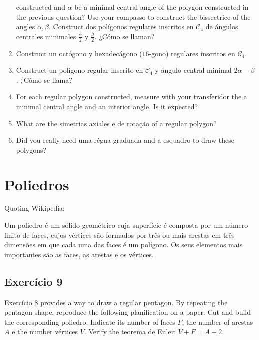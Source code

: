 \begin{enumerate}
  constructed and $\alpha$ be a minimal central angle of the polygon constructed
  in the previous question?
  Use your compasso to construct the bissectrice of the angles
  $\alpha, \beta$. Construct dos polígonos regulares inscritos en
  $\mathcal{C}_4$ de ángulos centrales minimales
  $\frac{\alpha}{2}$ y $\frac{\beta}{2}$. ¿Cómo se llaman?
\item Construct un octógono y hexadecágono ($16$-gono) regulares
  inscritos en $\mathcal{C}_4$.
\item Construct un polígono regular inscrito en $\mathcal{C}_4$ y
  ángulo central minimal $2 \alpha - \beta$. ¿Cómo se llama?
\item For each regular polygon constructed, measure with your transferidor the
  a minimal central angle and an interior angle. Is it expected?
\item What are the simetrias axiales e de rotação of a regular polygon?
\item Did you really need uma régua graduada and a esquadro to draw these
  polygons?
\end{enumerate}

\section{Poliedros}

Quoting Wikipedia:

Um poliedro é um sólido geométrico cuja superfície é composta por um número
finito de faces, cujos vértices são formados por três ou mais arestas em três
dimensões em que cada uma das faces é um polígono. Os seus elementos mais
importantes são as faces, as arestas e os vértices.

\subsection*{Exercício 9}

Exercício 8 provides a way to draw a regular pentagon. By repeating the
pentagon shape, reproduce the following
planification on a paper. Cut and build the corresponding poliedro. Indicate
its number of faces $F$, the number of arestas $A$ e the number vértices $V$.
Verify the teorema de Euler: $V + F = A + 2$.

